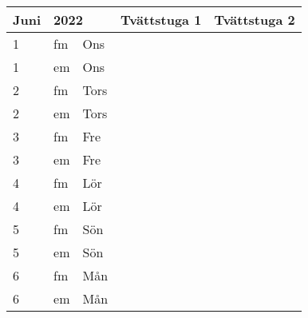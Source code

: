 \documentclass[a4paper]{article}
\begin{document}
\begin{table}[ht!]
\vspace{-10em}%
\normalsize
\begin{tabular}{lllp{7cm}p{7cm}}
\textbf{Juni}           & \multicolumn{2}{l}{\textbf{2022}}                  & \textbf{Tvättstuga 1} & \textbf{Tvättstuga 2} \\ \hline    

\multicolumn{1}{|l|}{1} & \multicolumn{1}{l|}{fm} & \multicolumn{1}{l|}{Ons} & \multicolumn{1}{l|}{} & \multicolumn{1}{l|}{} \\ \hline
\multicolumn{1}{|l|}{1} & \multicolumn{1}{l|}{em} & \multicolumn{1}{l|}{Ons} & \multicolumn{1}{l|}{} & \multicolumn{1}{l|}{} \\ \hline    

\multicolumn{1}{|l|}{2} & \multicolumn{1}{l|}{fm} & \multicolumn{1}{l|}{Tors} & \multicolumn{1}{l|}{} & \multicolumn{1}{l|}{} \\ \hline
\multicolumn{1}{|l|}{2} & \multicolumn{1}{l|}{em} & \multicolumn{1}{l|}{Tors} & \multicolumn{1}{l|}{} & \multicolumn{1}{l|}{} \\ \hline    

\multicolumn{1}{|l|}{3} & \multicolumn{1}{l|}{fm} & \multicolumn{1}{l|}{Fre} & \multicolumn{1}{l|}{} & \multicolumn{1}{l|}{} \\ \hline
\multicolumn{1}{|l|}{3} & \multicolumn{1}{l|}{em} & \multicolumn{1}{l|}{Fre} & \multicolumn{1}{l|}{} & \multicolumn{1}{l|}{} \\ \hline    

\multicolumn{1}{|l|}{4} & \multicolumn{1}{l|}{fm} & \multicolumn{1}{l|}{Lör} & \multicolumn{1}{l|}{} & \multicolumn{1}{l|}{} \\ \hline
\multicolumn{1}{|l|}{4} & \multicolumn{1}{l|}{em} & \multicolumn{1}{l|}{Lör} & \multicolumn{1}{l|}{} & \multicolumn{1}{l|}{} \\ \hline    

\multicolumn{1}{|l|}{5} & \multicolumn{1}{l|}{fm} & \multicolumn{1}{l|}{Sön} & \multicolumn{1}{l|}{} & \multicolumn{1}{l|}{} \\ \hline
\multicolumn{1}{|l|}{5} & \multicolumn{1}{l|}{em} & \multicolumn{1}{l|}{Sön} & \multicolumn{1}{l|}{} & \multicolumn{1}{l|}{} \\ \hline    

\multicolumn{1}{|l|}{6} & \multicolumn{1}{l|}{fm} & \multicolumn{1}{l|}{Mån} & \multicolumn{1}{l|}{} & \multicolumn{1}{l|}{} \\ \hline
\multicolumn{1}{|l|}{6} & \multicolumn{1}{l|}{em} & \multicolumn{1}{l|}{Mån} & \multicolumn{1}{l|}{} & \multicolumn{1}{l|}{} \\ \hline    


\end{tabular}
\end{table}
\end{document}
